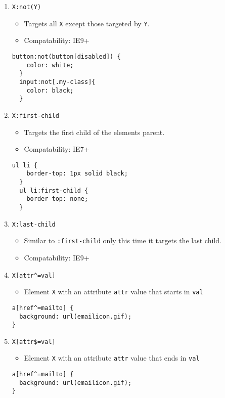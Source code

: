 \documentclass[10pt, twocolumn]{article}
\begin{document}
\begin{enumerate}
\item {\texttt{X:not(Y)}}
  \begin{itemize}
    \item Targets all \texttt{X} except those targeted by \texttt{Y}.
    \item Compatability: IE9+
  \end{itemize}
  \begin{lstlisting}[frame=single]
  button:not(button[disabled]) {
    color: white;
  }
  input:not[.my-class]{
    color: black;
  }
  \end{lstlisting}

\item {\texttt{X:first-child}}
  \begin{itemize}
    \item Targets the first child of the elements parent.  
    \item Compatability: IE7+
  \end{itemize}
  \begin{lstlisting}[frame=single]
  ul li {
    border-top: 1px solid black;
  }
  ul li:first-child {
    border-top: none;
  }
  \end{lstlisting}

\item {\texttt{X:last-child}}
  \begin{itemize}
    \item Similar to \texttt{:first-child} only this time it targets the last child.
    \item Compatability: IE9+
  \end{itemize}

\item \texttt{X[attr\^{}=val]}
\begin{itemize}
\item Element \texttt{X} with an attribute \texttt{attr} value that starts in \texttt{val}
\end{itemize}
\begin{lstlisting}[frame=single]
a[href^=mailto] {
  background: url(emailicon.gif);
}
\end{lstlisting}

\item \texttt{X[attr\$=val]}
\begin{itemize}
\item Element \texttt{X} with an attribute \texttt{attr} value that ends in \texttt{val}
\end{itemize}
\begin{lstlisting}[frame=single]
a[href^=mailto] {
  background: url(emailicon.gif);
}
\end{lstlisting}


\end{enumerate}
\end{document}
